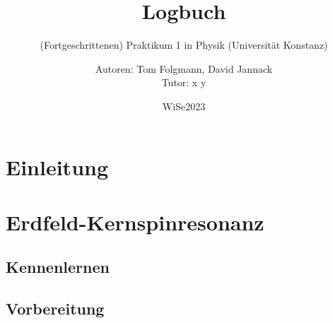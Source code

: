 \documentclass[
    twoside=true, 
    footinclude=off, 
    captions=tableheading, 
    DIV=12;usenames,
    dvipsnames
]{scrartcl}
\begin{document}
    \title{Logbuch}
    \subtitle{(Fortgeschrittenen) Praktikum 1 in Physik (Universität Konstanz)}
    \author{Autoren: Tom Folgmann, David Jannack \\ \large{Tutor: x y}}
    \date{WiSe2023}
    \maketitle
    \thispagestyle{empty}
    \section*{Einleitung}
        

    \newpage


    \tableofcontents
    \thispagestyle{empty}	
    \newpage
    \setcounter{page}{1}

\newtheorem{quest}{Vorbereitungsthema }
\newtheorem{answ}{Antwort }
\newenvironment{Frage}{%
    \begin{center}
        \begin{minipage}{0.95\textwidth}
            \dotfill
            \begin{quest}\end{quest}
}{
            
            \dotfill
        \end{minipage}
    \end{center}
}
\newenvironment{Antwort}{}{}



\newpage
\section{Erdfeld-Kernspinresonanz}
    \subsection*{Kennenlernen}
        
    
    \subsection*{Vorbereitung}
        



%
\end{document}
